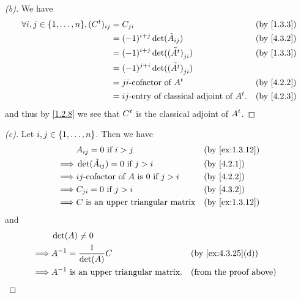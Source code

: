 \begin{proof}[(b)]
  We have
  \begin{align*}
    \forall i, j \in \set{1, \dots, n}, (\tp{C})_{i j} & = C_{j i}                                           &  & \text{(by \cref{1.3.3})} \\
                                                       & = (-1)^{i + j} \det(\tilde{A}_{i j})                &  & \text{(by \cref{4.3.2})} \\
                                                       & = (-1)^{i + j} \det(\tilde{(\tp{A})}_{j i})         &  & \text{(by \cref{1.3.3})} \\
                                                       & = (-1)^{j + i} \det(\tilde{(\tp{A})}_{j i})                                       \\
                                                       & = j i\text{-cofactor of } \tp{A}                    &  & \text{(by \cref{4.2.2})} \\
                                                       & = i j\text{-entry of classical adjoint of } \tp{A}. &  & \text{(by \cref{4.2.3})}
  \end{align*}
  and thus by \cref{1.2.8} we see that \({C}^{t}\) is the classical adjoint of \({A}^{t}\).
\end{proof}

\begin{proof}[(c)]
  Let \(i, j \in \left\lbrace1, \dots, n\right\rbrace\).
  Then we have
  \begin{align*}
             & A_{i j} = 0 \text{ if } i > j                             &  & \text{(by \cref{ex:1.3.12})} \\
    \implies & \det(\tilde{A}_{i j}) = 0 \text{ if } j > i               &  & \text{(by \cref{4.2.1})}     \\
    \implies & i j\text{-cofactor of } A \text{ is } 0 \text{ if } j > i &  & \text{(by \cref{4.2.2})}     \\
    \implies & C_{j i} = 0 \text{ if } j > i                             &  & \text{(by \cref{4.3.2})}     \\
    \implies & C \text{ is an upper triangular matrix}                   &  & \text{(by \cref{ex:1.3.12})}
  \end{align*}
  and
  \begin{align*}
             & \det(A) \neq 0                                                                     \\
    \implies & A^{-1} = \frac{1}{\det(A)} C                  &  & \text{(by \cref{ex:4.3.25}(d))} \\
    \implies & A^{-1} \text{ is an upper triangular matrix}. &  & \text{(from the proof above)}
  \end{align*}
\end{proof}
